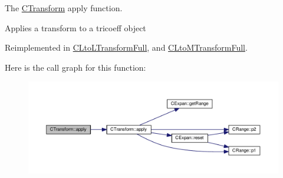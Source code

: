 The \hyperlink{classCTransform}{C\-Transform} apply function. 

Applies a transform to a tricoeff object 

Reimplemented in \hyperlink{classCLtoLTransformFull_a94f06010f02e569eb05bea892ab0ac59}{C\-Lto\-L\-Transform\-Full}, and \hyperlink{classCLtoMTransformFull_a33fc7534a1f9a6db9f55353f12df96dd}{C\-Lto\-M\-Transform\-Full}.



Here is the call graph for this function\-:\nopagebreak
\begin{figure}[H]
\begin{center}
\leavevmode
\includegraphics[width=350pt]{classCTransform_a986c0b58c44e47823f6811eeb4b5d096_cgraph}
\end{center}
\end{figure}


